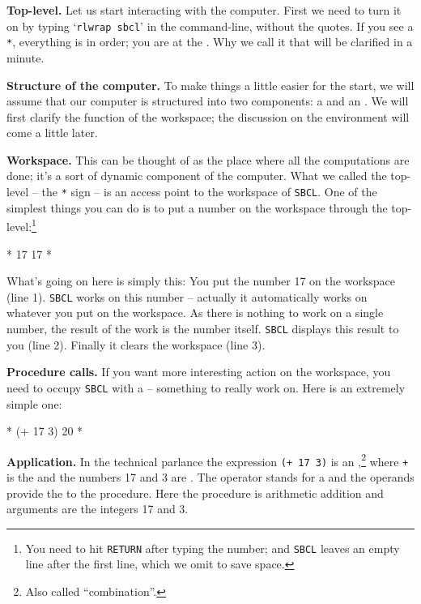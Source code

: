 \documentclass[a4paper,11pt]{article}
\begin{document}
\begin{uenum}
\item {\bf Top-level.} Let us start interacting with the computer. First we need to turn it on by typing `\Verb+rlwrap sbcl+' in the command-line, without the quotes. If you see a \Verb+*+, everything is in order; you are at the . Why we call it that will be clarified in a minute.

\item {\bf Structure of the computer.} To make things a little easier for the start, we will assume that our computer is structured into two components: a  and an . We will first clarify the function of the workspace; the discussion on the environment will come a little later. 

\item {\bf Workspace.} This can be thought of as the place where all the computations are done; it's a sort of dynamic component of the computer. What we called the top-level -- the \Verb+*+ sign -- is an access point to the workspace of \Verb+SBCL+. One of the simplest things you can do is to put a number on the workspace through the top-level:\footnote{You need to hit \Verb+RETURN+ after typing the number; and \Verb+SBCL+ leaves an empty line after the first line, which we omit to save space.} 

\begin{lispcode}
* 17
17
* 
\end{lispcode}

What's going on here is simply this: You put the number 17 on the workspace (line 1). \Verb+SBCL+ works on this number -- actually it automatically works on whatever you put on the workspace. As there is nothing to work on a single number, the result of the work is the number itself. \Verb+SBCL+ displays this result to you (line 2). Finally it clears the workspace (line 3).

\item {\bf Procedure calls.} If you want more interesting action on the workspace, you need to occupy \Verb+SBCL+ with a  -- something to really work on. Here is an extremely simple one: 

\begin{lispcode}
* (+ 17 3)
20
*
\end{lispcode}

\item {\bf Application.} In the technical parlance the expression \Verb-(+ 17 3)- is an ,\footnote{Also called ``combination''.} where \Verb-+- is the  and the numbers 17 and 3 are . The operator stands for a  and the operands provide the  to the procedure. Here the procedure is arithmetic addition and arguments are the integers 17 and 3.


\end{uenum}
\end{document}
